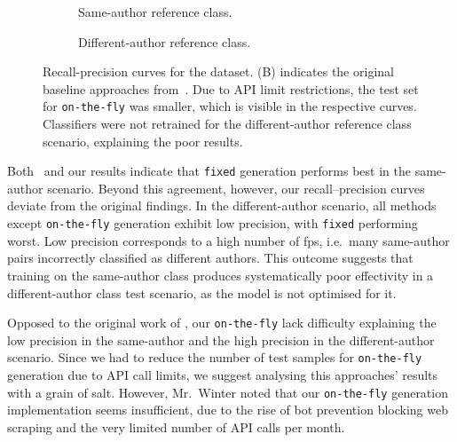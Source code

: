 \begin{figure}[htbp]
  \centering
  \begin{subfigure}[b]{0.9\textwidth}
    \centering
    
    \caption{Same-author reference class. }
    \label{fig:blog_same_author}
  \end{subfigure}
  \hfill
  \begin{subfigure}[b]{0.9\textwidth}
    \centering
    
    \caption{Different-author reference class.}
    \label{fig:blog_diff_author}
  \end{subfigure}
  \caption[Recall-precision curves for the \dataBlog{} dataset]{Recall-precision curves for the \dataBlog{} dataset. 
  (B) indicates the original baseline approaches from~\citet{koppel_determining_2014}.
  Due to API limit restrictions, the test set for \texttt{on-the-fly} was smaller, which is visible in the respective curves.
  Classifiers were not retrained for the different-author reference class scenario, explaining the poor results.}
  \label{fig:diff_imp_gen_blog}
\end{figure}

Both \citet{koppel_determining_2014}\ and our results indicate that \texttt{fixed} \imp{} generation performs best in the same-author scenario.
Beyond this agreement, however, our recall–precision curves deviate from the original findings.
In the different-author scenario, all methods except \texttt{on-the-fly} generation exhibit low precision, with \texttt{fixed} \imps{} performing worst.
Low precision corresponds to a high number of \acp{fp}, i.e.\ many same-author pairs incorrectly classified as different authors.
This outcome suggests that training on the same-author class produces systematically poor effectivity in a different-author class test scenario, as the model is not optimised for it.

Opposed to the original work of \citet{koppel_determining_2014}, our \texttt{on-the-fly} \imps{} lack difficulty explaining the low precision in the same-author and the high precision in the different-author scenario.
Since we had to reduce the number of test samples for \texttt{on-the-fly} \imp{} generation due to API call limits, we suggest analysing this approaches' results with a grain of salt.
However, Mr.\ Winter noted that our \texttt{on-the-fly} \imp{} generation implementation seems insufficient, due to the rise of bot prevention blocking web scraping and the very limited number of API calls per month.
